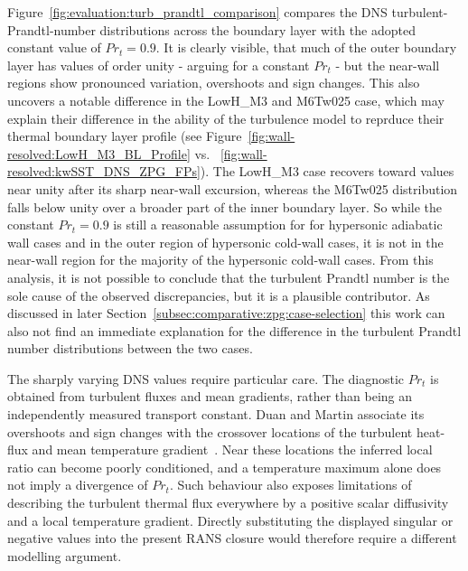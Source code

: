 Figure~\ref{fig:evaluation:turb_prandtl_comparison} compares the DNS turbulent-Prandtl-number distributions across the boundary layer with the adopted constant value of \(Pr_t = 0.9\). It is clearly visible, that much of the outer boundary layer has values of order unity - arguing for a constant \(Pr_t\) - but the near-wall regions show pronounced variation, overshoots and sign changes. This also uncovers a notable difference in the LowH\_M3 and M6Tw025 case, which may explain their difference in the ability of the turbulence model to reprduce their thermal boundary layer profile (see Figure~\ref{fig:wall-resolved:LowH_M3_BL_Profile} vs. ~\ref{fig:wall-resolved:kwSST_DNS_ZPG_FPs}). The LowH\_M3 case recovers toward values near unity after its sharp near-wall excursion, whereas the M6Tw025 distribution falls below unity over a broader part of the inner boundary layer. So while the constant \(Pr_t = 0.9\) is still a reasonable assumption for for hypersonic adiabatic wall cases and in the outer region of hypersonic cold-wall cases, it is not in the near-wall region for the majority of the hypersonic cold-wall cases. From this analysis, it is not possible to conclude that the turbulent Prandtl number is the sole cause of the observed discrepancies, but it is a plausible contributor. As discussed in later Section~\ref{subsec:comparative:zpg:case-selection} this work can also not find an immediate explanation for the difference in the turbulent Prandtl number distributions between the two cases.
\par\medskip

The sharply varying DNS values require particular care. The diagnostic \(Pr_t\) is obtained from turbulent fluxes and mean gradients, rather than being an independently measured transport constant. Duan and Martin associate its overshoots and sign changes with the crossover locations of the turbulent heat-flux and mean temperature gradient~\cite[Section~5]{duan2011direct_Part4}. Near these locations the inferred local ratio can become poorly conditioned, and a temperature maximum alone does not imply a divergence of \(Pr_t\). Such behaviour also exposes limitations of describing the turbulent thermal flux everywhere by a positive scalar diffusivity and a local temperature gradient. Directly substituting the displayed singular or negative values into the present RANS closure would therefore require a different modelling argument.

